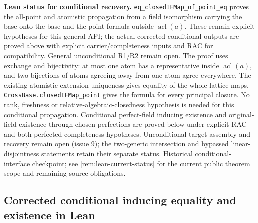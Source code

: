\documentclass[11pt,oneside]{article}
\theoremstyle{definition}
\theoremstyle{remark}
\newcommand{\acl}{\operatorname{acl}}
\newcommand{\lean}[1]{\nolinkurl{#1}}
\begin{document}
\noindent\textbf{Lean status for conditional recovery.}
\lean{eq_closedIFMap_of_point_eq} proves the all-point and atomistic propagation
from a field isomorphism carrying the base onto the base and the point formula
outside $\acl(a)$. These remain explicit hypotheses for this general API; the
actual corrected conditional outputs are proved above with explicit carrier/completeness
inputs and RAC for compatibility. General unconditional R1/R2 remain open. The proof uses
exchange and bijectivity:
at most one atom has a representative inside $\acl(a)$, and two bijections of atoms
agreeing away from one atom agree everywhere. The existing atomistic extension
uniqueness gives equality of the whole lattice maps.
\lean{CrossBase.closedIFMap_point} gives the formula for every principal closure.
No rank, freshness or relative-algebraic-closedness hypothesis is needed for this
conditional propagation. Conditional perfect-field inducing existence and
original-field existence through chosen perfections are proved below under
explicit RAC and both perfected completeness hypotheses. Unconditional target assembly
and recovery remain open (issue 9); the two-generic intersection
and bypassed linear-disjointness statements retain their separate status.
Historical conditional-interface checkpoint; see \cref{rem:lean-current-status} for
the current public theorem scope and remaining source obligations.


\subsection{Corrected conditional inducing equality and existence in Lean}
\end{document}
